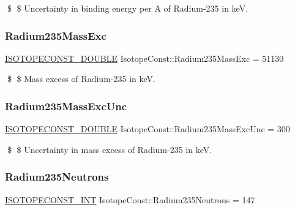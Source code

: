 \$ \$ Uncertainty in binding energy per A of Radium-\/235 in keV. \mbox{\label{group___isotope_const-_radium-_ra235_gab62896a195a8e6386fb206d14ad80c7a}} 
\subsubsection{\texorpdfstring{Radium235\+Mass\+Exc}{Radium235MassExc}}
{\footnotesize\ttfamily \mbox{\hyperlink{group___isotope_const-_macros_ga8f45a7272ce02c0b4c65c44636ed719a}{I\+S\+O\+T\+O\+P\+E\+C\+O\+N\+S\+T\+\_\+\+D\+O\+U\+B\+LE}} Isotope\+Const\+::\+Radium235\+Mass\+Exc = 51130}

\$ \$ Mass excess of Radium-\/235 in keV. \mbox{\label{group___isotope_const-_radium-_ra235_gaeff475d9584cd9aa247c904eb506cca8}} 
\subsubsection{\texorpdfstring{Radium235\+Mass\+Exc\+Unc}{Radium235MassExcUnc}}
{\footnotesize\ttfamily \mbox{\hyperlink{group___isotope_const-_macros_ga8f45a7272ce02c0b4c65c44636ed719a}{I\+S\+O\+T\+O\+P\+E\+C\+O\+N\+S\+T\+\_\+\+D\+O\+U\+B\+LE}} Isotope\+Const\+::\+Radium235\+Mass\+Exc\+Unc = 300}

\$ \$ Uncertainty in mass excess of Radium-\/235 in keV. \mbox{\label{group___isotope_const-_radium-_ra235_ga190ef1508970c3277fc2eceacee808bd}} 
\subsubsection{\texorpdfstring{Radium235\+Neutrons}{Radium235Neutrons}}
{\footnotesize\ttfamily \mbox{\hyperlink{group___isotope_const-_macros_ga5f18360b3e99483a35c32d789e62621c}{I\+S\+O\+T\+O\+P\+E\+C\+O\+N\+S\+T\+\_\+\+I\+NT}} Isotope\+Const\+::\+Radium235\+Neutrons = 147}


